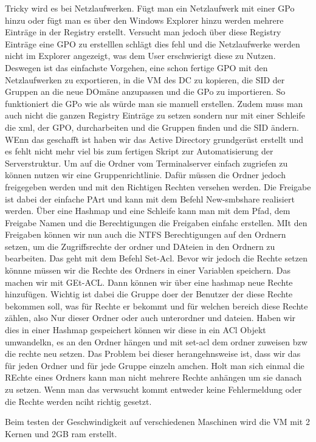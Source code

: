 \documentclass[conference]{IEEEtran}
\begin{document}
Tricky wird es bei Netzlaufwerken. Fügt man ein Netzlaufwerk mit einer GPo hinzu oder fügt man es über den Windows Explorer hinzu werden mehrere Einträge in der Registry erstellt. Versucht man jedoch über diese Registry Einträge eine GPO zu erstelllen schlägt dies fehl und die Netzlaufwerke werden nicht im Explorer angezeigt, was dem User erschwierigt diese zu Nutzen. Deswegen ist das einfachste Vorgehen, eine schon fertige GPO mit den Netzlaufwerken zu exportieren, in die VM des DC zu kopieren, die SID der Gruppen an die neue DOmäne anzupassen und die GPo zu importieren. So funktioniert die GPo wie als würde man sie manuell erstellen. Zudem muss man auch nicht die ganzen Registry Einträge zu setzen sondern nur mit einer Schleife die xml, der GPO,  durcharbeiten und die Gruppen finden und die SID ändern.
WEnn das geschafft ist haben wir das Active Directory grundgerüst erstellt und es fehlt nicht mehr viel bis zum fertigen Skript zur Automatisierung der Serverstruktur.
Um auf die Ordner vom Terminalserver einfach zugriefen zu können nutzen wir eine Gruppenrichtlinie. Dafür müssen die Ordner jedoch freigegeben werden und mit den Richtigen Rechten versehen werden. Die Freigabe ist dabei der einfache PArt und kann mit dem Befehl New-smbshare realisiert werden. Über eine Hashmap und eine Schleife kann man mit dem Pfad, dem Freigabe Namen und die Berechtigungen die Freigaben einfahc erstellen.
MIt den Freigaben können wir nun auch die NTFS Berechtigungen auf den Ordnern setzen, um die Zugriffsrechte der ordner und DAteien in den Ordnern zu bearbeiten. Das geht mit dem Befehl Set-Acl. Bevor wir jedoch die Rechte setzen könnne müssen wir die Rechte des Ordners in einer Variablen speichern. Das machen wir mit GEt-ACL. Dann können wir über eine hashmap neue Rechte hinzufügen. Wichtig ist dabei die Gruppe doer der Benutzer der diese Rechte bekommen soll, was für Rechte er bekommt und für welchen bereich diese Rechte zählen, also Nur dieser Ordner oder auch unterordner und dateien. Haben wir dies in einer Hashmap gespeichert können wir diese in ein ACl Objekt umwandelkn, es an den Ordner hängen und mit set-acl dem ordner zuweisen bzw die rechte neu setzen. Das Problem bei dieser herangehnsweise ist, dass wir das für jeden Ordner und für jede Gruppe einzeln amchen. 
Holt man sich einmal die REchte eines Ordners kann man nicht mehrere Rechte anhängen um sie danach zu setzen. Wenn man das verwsucht kommt entweder keine Fehlermeldung oder die Rechte werden nciht richtig gesetzt. 


Beim testen der Geschwindigkeit auf verschiedenen Maschinen wird die VM mit 2 Kernen und 2GB ram erstellt.


\end{document}

